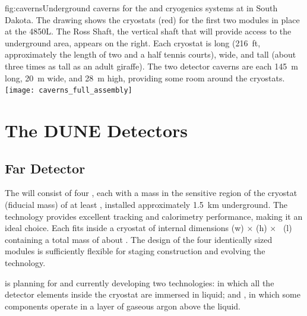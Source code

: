 \begin{dunefigure}{fig:caverns}{Underground caverns for the   and cryogenics systems at  in South Dakota. The drawing shows the cryostats (red) for the first two  modules  in place at the 4850L. The Ross Shaft, the vertical shaft that will provide access to the  underground area, appears on the right. 
Each cryostat is \cryostatlen long (\SI{216}{ft}, approximately the length of two and a half tennis courts), \cryostatwdth wide, and \cryostatht tall (about three times as tall as an adult giraffe).
The two detector caverns are each \SI{145}{\meter} long, \SI{20}{\meter} wide,  and 
\SI{28}{\meter} high, providing some room around the cryostats.}
\texttt{[image: caverns\_full\_assembly]}
\end{dunefigure}




\section{The DUNE Detectors}




\subsection{Far Detector}
\label{ch:dune-det-tech-ov-fd}

The \fdfiducialmass {}  will consist of four  , each with a  mass in the sensitive region of the cryostat (fiducial mass) of at least \nominalmodsize, installed approximately \SI{1.5}{km} underground. The  technology provides
excellent tracking and calorimetry performance, making it an ideal 
choice. Each  fits inside a cryostat of internal dimensions
\cryostatwdthinner (w) $\times$ \cryostathtinner (h) $\times$ \cryostatleninner~(l) containing a total  mass of about \larmass{}.
 The design of the four identically sized modules is sufficiently flexible for staging construction and evolving the  technology.

 is planning for and currently developing two  technologies:  in which all the detector elements inside the cryostat are immersed in liquid; and , in which some components operate in a layer of gaseous argon above the liquid.

